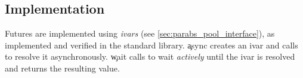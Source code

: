 \subsection{Implementation}
\label{sec:parabs_future_impl}

Futures are implemented using \emph{ivars} (see \cref{sec:parabs_pool_interface}), as implemented and verified in the \Zoo standard library.
\c{async} creates an ivar and calls  to resolve it asynchronously.
\c{wait} calls  to wait \emph{actively} until the ivar is resolved and returns the resulting value.
